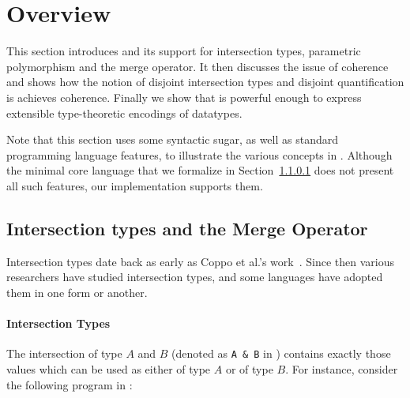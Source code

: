 \section{Overview}

This section introduces \name and its support for intersection types,
parametric polymorphism and the merge operator. It then discusses 
the issue of coherence and shows how the notion of disjoint
intersection types and disjoint quantification is achieves coherence.
Finally we show that \name is powerful enough to express
extensible type-theoretic encodings of datatypes.

Note that this section uses some syntactic sugar, as well as standard 
programming language features, to illustrate the various concepts in
\name. Although the minimal core language that we formalize in
Section~\ref{} does not present all such features, our implementation 
supports them. 



\begin{comment}
It then shows that,
with unrestricted intersection types, the system
lacks \emph{coherence}. This motivates the introduction of
disjoint intersection types and extending universal quatification to
disjoint quantification, which is enough to ensure coherence.
\end{comment}

\subsection{Intersection types and the Merge Operator}

Intersection types date back as early as Coppo et
al.'s work~\cite{coppo1981functional}. Since then various researchers have
studied intersection types, and some languages have adopted them in one
form or another. 


\paragraph{Intersection Types}
The intersection of type $A$ and $B$ (denoted as \lstinline{A & B} in
\name) contains exactly those values
which can be used as either of type $A$ or of type $B$. For instance,
consider the following program in \name:

